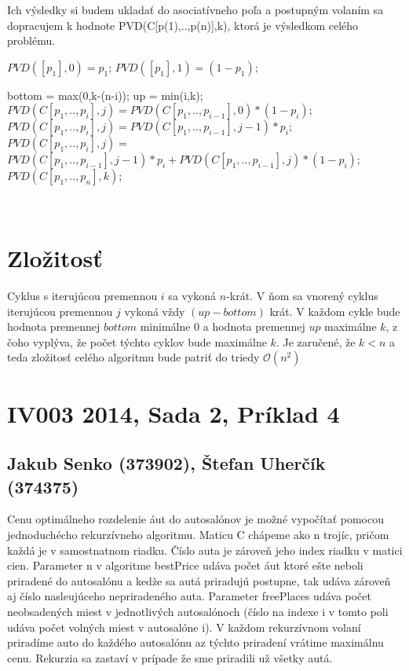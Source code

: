 \documentclass[paper=a4, fontsize=11pt]{scrartcl} %
\numberwithin{equation}{section} %
\numberwithin{figure}{section} %
\numberwithin{table}{section} %
\begin{document}
Ich výsledky si budem ukladať do asociatívneho poľa a postupným volaním sa dopracujem k hodnote PVD(C[p(1),..,p(n)],k), ktorá je výsledkom celého problému. \ \\


\begin{algorithmic}[1]
		\State $PVD([p_1],0) = p_1$;
		\State $PVD([p_1],1) = (1-p_1)$;

			\State bottom = max(0,k-(n-i));
			\State up = min(i,k);
					\State $PVD(C[p_1,..,p_{i}],j) = PVD(C[p_1,..,p_{i-1}],0)*(1-p_i);$
				\Else {}
					\State $PVD(C[p_1,..,p_{i}],j) = PVD(C[p_1,..,p_{i-1}],j-1)*p_i;$
				\Else 
					\State $PVD(C[p_1,..,p_{i}],j) = $
					\State $PVD(C[p_1,..,p_{i-1}],j-1)*p_i + PVD(C[p_1,..,p_{i-1}],j)*(1-p_i);$
				\EndIf \EndIf
			\EndFor
		\EndFor
		\State \Return $PVD(C[p_{1},..,p_{n}],k);$
	\EndFunction
\end{algorithmic}
\ \\
\section*{Zložitosť}
Cyklus s iterujúcou premennou $i$ sa vykoná $n$-krát.
V ňom sa vnorený cyklus iterujúcou premennou $j$ vykoná vždy $(up - bottom)$ krát.
V každom cykle bude hodnota premennej $bottom$ minimálne 0 a hodnota premennej $up$ maximálne $k$, z čoho vyplýva, že počet týchto cyklov bude maximálne $k$.
Je zaručené, že $k < n$ a teda zložitosť celého algoritmu bude patriť do triedy $\mathcal{O}(n^2)$


\pagebreak


\section*{IV003 2014, Sada 2, Príklad 4}
\subsection*{Jakub Senko (373902), Štefan Uherčík (374375)}

Cenu optimálneho rozdelenie áut do autosalónov je možné vypočítať pomocou jednoduchécho rekurzívneho algoritmu.
Maticu C chápeme ako n trojíc, pričom každá je v samostnatnom riadku. Číslo auta je zároveň jeho index riadku v matici cien.
Parameter n v algoritme bestPrice udáva počet áut ktoré ešte neboli priradené do autosalónu a kedže sa autá priradujú postupne, tak udáva zároveň aj číslo nasleujúceho nepriradeného auta.
Parameter freePlaces udáva počet neobsadených miest v jednotlivých autosalónoch (číslo na indexe i v tomto poli udáva počet volných miest v autosalóne i).
V každom rekurzívnom volaní priradíme auto do každého autosalónu az týchto priradení vrátime maximálnu cenu.
Rekurzia sa zastaví v prípade že sme priradili už všetky autá.
\end{document}
